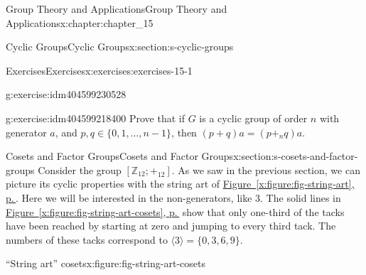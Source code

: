 \documentclass[twoside,10pt,]{book}
\newcommand{\xreffont}{\relax}
\numberwithin{equation}{section}
\begin{document}
\begin{chapterptx}{Group Theory and Applications}{}{Group Theory and Applications}{}{}{x:chapter:chapter_15}
\begin{sectionptx}{Cyclic Groups}{}{Cyclic Groups}{}{}{x:section:s-cyclic-groups}
\begin{exercises-subsection}{Exercises}{}{Exercises}{}{}{x:exercises:exercises-15-1}
\begin{divisionexercise}{9}{}{}{g:exercise:idm404599230528}
\begin{enumerate}[label=(\alph*)]
\end{enumerate}
%
\end{divisionexercise}%
\begin{divisionexercise}{10}{}{}{g:exercise:idm404599218400}%
Prove that if \(G\) is a cyclic group of order \(n\) with generator \(a\), and \(p, q \in  \{0, 1, \ldots , n - 1\}\), then \((p+q)a = \left(p+_nq\right)a\).%
\end{divisionexercise}%
\end{exercises-subsection}
\end{sectionptx}
%
%
\typeout{************************************************}
\typeout{************************************************}
%
\begin{sectionptx}{Cosets and Factor Groups}{}{Cosets and Factor Groups}{}{}{x:section:s-cosets-and-factor-groups}
%
Consider the group \(\left[\mathbb{Z}_{12};+_{12}\right]\). As we saw in the previous section, we can picture its cyclic properties with the string art of \hyperref[x:figure:fig-string-art]{Figure~{\xreffont\ref{x:figure:fig-string-art}}, p.\,\pageref{x:figure:fig-string-art}}. Here we will be interested in the non-generators, like 3. The solid lines in \hyperref[x:figure:fig-string-art-cosets]{Figure~{\xreffont\ref{x:figure:fig-string-art-cosets}}, p.\,\pageref{x:figure:fig-string-art-cosets}} show that only one-third of the tacks have been reached by starting at zero and jumping to every third tack. The numbers of these tacks correspond to \(\langle 3 \rangle = \{0, 3, 6, 9\}\).%
\begin{figureptx}{``String art'' cosets}{x:figure:fig-string-art-cosets}{}%
\begin{image}{0.15}{0.7}{0.15}%

\end{image}
\end{figureptx}
\end{sectionptx}
\end{chapterptx}
\end{document}
